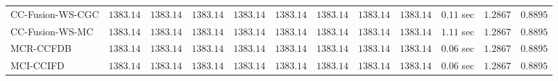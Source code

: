 \begin{table}[H]
\begin{tabular}{lrrrrrrrrrrr}
    CC-Fusion-WS-CGC & $      1383.14$ & $      1383.14$ & $      1383.14$ & $      1383.14$ & $      1383.14$ & $      1383.14$ & $      1383.14$ & $      1383.14$ & $         0.11$ sec    & $       1.2867$  & $       0.8895$ \\ 
     CC-Fusion-WS-MC & $      1383.14$ & $      1383.14$ & $      1383.14$ & $      1383.14$ & $      1383.14$ & $      1383.14$ & $      1383.14$ & $      1383.14$ & $         1.11$ sec    & $       1.2867$  & $       0.8895$ \\ 
\cmidrule{1-1} 
           MCR-CCFDB & $      1383.14$ & $      1383.14$ & $      1383.14$ & $      1383.14$ & $      1383.14$ & $      1383.14$ & $      1383.14$ & $      1383.14$ & $         0.06$ sec    & $       1.2867$  & $       0.8895$ \\ 
\cmidrule{1-1} 
           MCI-CCIFD & $      1383.14$ & $      1383.14$ & $      1383.14$ & $      1383.14$ & $      1383.14$ & $      1383.14$ & $      1383.14$ & $      1383.14$ & $         0.06$ sec    & $       1.2867$  & $       0.8895$ \\ 
\bottomrule
\end{tabular}
\end{table}

